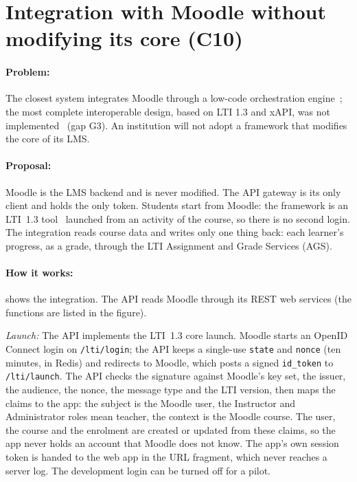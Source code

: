 \section[Integration with Moodle]{Integration with Moodle without modifying its core (C10)}
\label{sec-c8}

\paragraph{Problem:} The closest system integrates Moodle through a
low-code orchestration engine~\cite{lopezgoyez2026ela}; the most complete
interoperable design, based on LTI 1.3 and xAPI, was not
implemented~\cite{khaddar2026ijacsa} (gap G3). An institution will not
adopt a framework that modifies the core of its LMS.

\paragraph{Proposal:} Moodle is the LMS backend and is never modified.
The API gateway is its only client and holds the only token. Students
start from Moodle: the framework is an LTI~1.3 tool~\cite{lti13} launched
from an activity of the course, so there is no second login. The
integration reads course data and writes only one thing back: each
learner's progress, as a grade, through the LTI Assignment and Grade
Services (AGS).

\paragraph{How it works:}  shows the
integration. The API reads Moodle through its REST web services (the
functions are listed in the figure).

\emph{Launch:} The API implements the LTI~1.3 core launch. Moodle starts
an OpenID Connect login on \texttt{/lti/login}; the API keeps a single-use
\texttt{state} and \texttt{nonce} (ten minutes, in Redis) and redirects to
Moodle, which posts a signed \texttt{id\_token} to \texttt{/lti/launch}.
The API checks the signature against Moodle's key set, the issuer, the
audience, the nonce, the message type and the LTI version, then maps the
claims to the app: the subject is the Moodle user, the Instructor and
Administrator roles mean teacher, the context is the Moodle course. The
user, the course and the enrolment are created or updated from these
claims, so the app never holds an account that Moodle does not know.
The app's own session token is handed to the web app in the URL
fragment, which never reaches a server log. The development login can be
turned off for a pilot.


